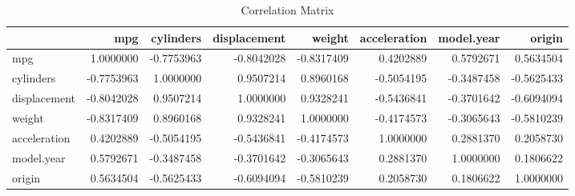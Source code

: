 \begin{table}[h!]
	\centering
	\begin{tabular}{lrrrrrrr}
		\hline
		& mpg & cylinders & displacement & weight & acceleration & model.year & origin \\
		\hline
		mpg & 1.0000000 & -0.7753963 & -0.8042028 & -0.8317409 & 0.4202889 & 0.5792671 & 0.5634504 \\
		cylinders & -0.7753963 & 1.0000000 & 0.9507214 & 0.8960168 & -0.5054195 & -0.3487458 & -0.5625433 \\
		displacement & -0.8042028 & 0.9507214 & 1.0000000 & 0.9328241 & -0.5436841 & -0.3701642 & -0.6094094 \\
		weight & -0.8317409 & 0.8960168 & 0.9328241 & 1.0000000 & -0.4174573 & -0.3065643 & -0.5810239 \\
		acceleration & 0.4202889 & -0.5054195 & -0.5436841 & -0.4174573 & 1.0000000 & 0.2881370 & 0.2058730 \\
		model.year & 0.5792671 & -0.3487458 & -0.3701642 & -0.3065643 & 0.2881370 & 1.0000000 & 0.1806622 \\
		origin & 0.5634504 & -0.5625433 & -0.6094094 & -0.5810239 & 0.2058730 & 0.1806622 & 1.0000000 \\
		\hline
	\end{tabular}
	\caption{Correlation Matrix}
\end{table}